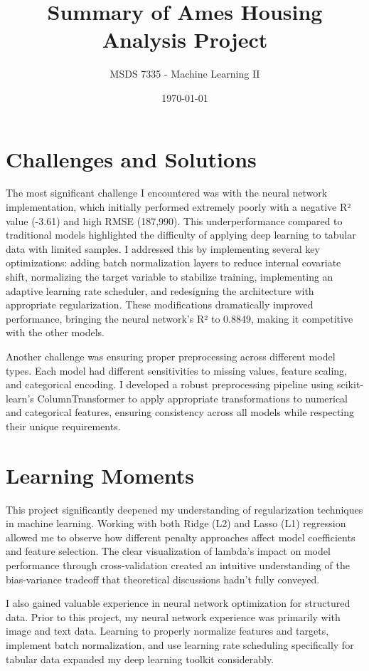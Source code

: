 \documentclass[12pt]{article}
\title{Summary of Ames Housing Analysis Project}
\author{MSDS 7335 - Machine Learning II}
\date{\today}
\begin{document}
\maketitle

\section*{Challenges and Solutions}

The most significant challenge I encountered was with the neural network implementation, which initially performed extremely poorly with a negative R² value (-3.61) and high RMSE (187,990). This underperformance compared to traditional models highlighted the difficulty of applying deep learning to tabular data with limited samples. I addressed this by implementing several key optimizations: adding batch normalization layers to reduce internal covariate shift, normalizing the target variable to stabilize training, implementing an adaptive learning rate scheduler, and redesigning the architecture with appropriate regularization. These modifications dramatically improved performance, bringing the neural network's R² to 0.8849, making it competitive with the other models.

Another challenge was ensuring proper preprocessing across different model types. Each model had different sensitivities to missing values, feature scaling, and categorical encoding. I developed a robust preprocessing pipeline using scikit-learn's ColumnTransformer to apply appropriate transformations to numerical and categorical features, ensuring consistency across all models while respecting their unique requirements.

\section*{Learning Moments}

This project significantly deepened my understanding of regularization techniques in machine learning. Working with both Ridge (L2) and Lasso (L1) regression allowed me to observe how different penalty approaches affect model coefficients and feature selection. The clear visualization of lambda's impact on model performance through cross-validation created an intuitive understanding of the bias-variance tradeoff that theoretical discussions hadn't fully conveyed.

I also gained valuable experience in neural network optimization for structured data. Prior to this project, my neural network experience was primarily with image and text data. Learning to properly normalize features and targets, implement batch normalization, and use learning rate scheduling specifically for tabular data expanded my deep learning toolkit considerably.
\end{document}
